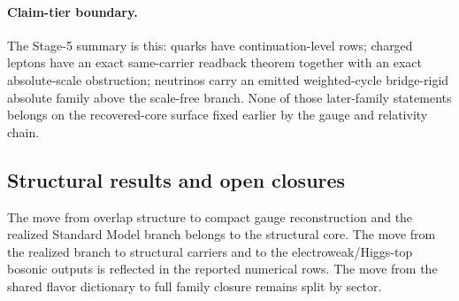 \documentclass[11pt]{article}
\begin{document}
\paragraph{Claim-tier boundary.}
The Stage-5 summary is this: quarks have continuation-level rows; charged leptons have an exact same-carrier readback theorem together with an exact absolute-scale obstruction; neutrinos carry an emitted weighted-cycle bridge-rigid absolute family above the scale-free branch. None of those later-family statements belongs on the recovered-core surface fixed earlier by the gauge and relativity chain.
\subsection{Structural results and open closures}\label{step5-structural-results-and-open-closures}

The move from overlap structure to compact gauge reconstruction and the realized Standard Model branch belongs to the structural core. The move from the realized branch to structural carriers and to the electroweak/Higgs-top bosonic outputs is reflected in the reported numerical rows. The move from the shared flavor dictionary to full family closure remains split by sector.
\end{document}
